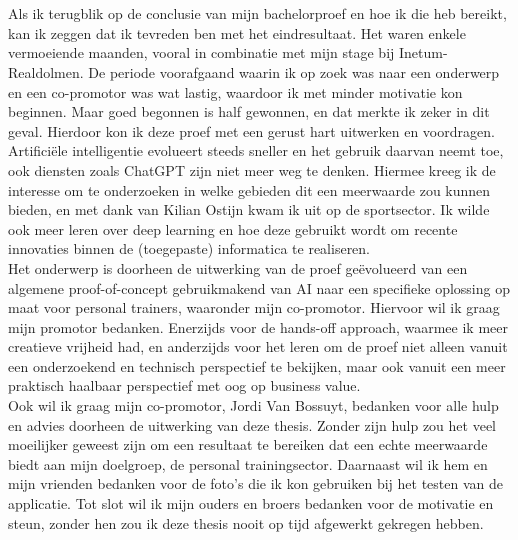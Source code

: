 
\chapter*{}%
\label{ch:voorwoord}

Als ik terugblik op de conclusie van mijn bachelorproef en hoe ik die heb bereikt, kan ik zeggen dat ik tevreden ben met het eindresultaat.
Het waren enkele vermoeiende maanden, vooral in combinatie met mijn stage bij Inetum-Realdolmen.
De periode voorafgaand waarin ik op zoek was naar een onderwerp en een co-promotor was wat lastig, waardoor ik met minder motivatie kon beginnen.
Maar goed begonnen is half gewonnen, en dat merkte ik zeker in dit geval.
Hierdoor kon ik deze proef met een gerust hart uitwerken en voordragen.\\

Artificiële intelligentie evolueert steeds sneller en het gebruik daarvan neemt toe, ook diensten zoals ChatGPT zijn niet meer weg te denken.
Hiermee kreeg ik de interesse om te onderzoeken in welke gebieden dit een meerwaarde zou kunnen bieden, en met dank van Kilian Ostijn kwam ik uit op de sportsector.
Ik wilde ook meer leren over deep learning en hoe deze gebruikt wordt om recente innovaties binnen de (toegepaste) informatica te realiseren.\\

Het onderwerp is doorheen de uitwerking van de proef geëvolueerd van een algemene proof-of-concept gebruikmakend van AI naar een specifieke oplossing op maat voor personal trainers, waaronder mijn co-promotor.
Hiervoor wil ik graag mijn promotor bedanken.
Enerzijds voor de hands-off approach, waarmee ik meer creatieve vrijheid had, en anderzijds voor het leren om de proef niet alleen vanuit een onderzoekend en technisch perspectief te bekijken, maar ook vanuit een meer praktisch haalbaar perspectief met oog op business value.\\

Ook wil ik graag mijn co-promotor, Jordi Van Bossuyt, bedanken voor alle hulp en advies doorheen de uitwerking van deze thesis.
Zonder zijn hulp zou het veel moeilijker geweest zijn om een resultaat te bereiken dat een echte meerwaarde biedt aan mijn doelgroep, de personal trainingsector.
Daarnaast wil ik hem en mijn vrienden bedanken voor de foto's die ik kon gebruiken bij het testen van de applicatie.
Tot slot wil ik mijn ouders en broers bedanken voor de motivatie en steun, zonder hen zou ik deze thesis nooit op tijd afgewerkt gekregen hebben.